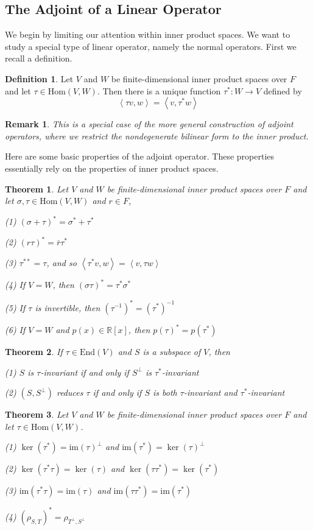 \documentclass{book}
\newtheorem{theorem}{Theorem}[section]
\newtheorem*{remark}{Remark}
\theoremstyle{definition}
\newtheorem{definition}{Definition}[section]
\begin{document}
\subsection{The Adjoint of a Linear Operator}
We begin by limiting our attention within inner product spaces. We want to study a special type of linear operator, namely the normal operators. First we recall a definition.
\begin{definition}
Let $V$ and $W$ be finite-dimensional inner product spaces over $F$ and let $\tau\in \text{Hom}(V,W)$. Then there is a unique function $\tau^*:W\to V$ defined by \[\left \langle\tau v,w \right \rangle =\left \langle v,\tau^*w \right \rangle  \]
\end{definition}
\begin{remark}
This is a special case of the more general construction of adjoint operators, where we restrict the nondegenerate bilinear form to the inner product.
\end{remark}
Here are some basic properties of the adjoint operator. These properties essentially rely on the properties of inner product spaces.
\begin{theorem}
Let $V$ and $W$ be finite-dimensional inner product spaces over $F$ and let $\sigma,\tau\in \text{Hom}(V,W)$ and $r\in F$,\par
(1) $(\sigma+\tau)^*=\sigma^*+\tau^*$\par
(2) $(r\tau)^*=\bar{r}\tau^*$\par
(3) $\tau^{**}=\tau$, and so $\left \langle\tau^* v,w \right \rangle =\left \langle v,\tau w \right \rangle $ \par
(4) If $V=W$, then $(\sigma\tau)^*=\tau^*\sigma^*$ \par
(5) If $\tau$ is invertible, then $(\tau^{-1})^*=(\tau^*)^{-1}$\par
(6) If $V=W$ and $p(x)\in\mathbb{R}[x]$, then $p(\tau)^*=p(\tau^*)$\par
\end{theorem}
\begin{theorem}
If $\tau\in \text{End}(V)$ and $S$ is a subspace of $V$, then\par
(1) $S$ is $\tau$-invariant if and only if $S^\perp$ is $\tau^*$-invariant \par
(2) $(S,S^\perp)$ reduces $\tau$ if and only if $S$ is both $\tau$-invariant and $\tau^*$-invariant
\end{theorem}
\begin{theorem}
Let $V$ and $W$ be finite-dimensional inner product spaces over $F$ and let $\tau\in \text{Hom}(V,W)$. \par
(1) $\ker(\tau^*)=\text{im}(\tau)^\perp$ and $\text{im}(\tau^*)=\ker(\tau)^\perp$ \par
(2) $\ker(\tau^*\tau)=\ker(\tau)$ and $\ker(\tau\tau^*)=\ker(\tau^*)$ \par
(3) $\text{im}(\tau^*\tau)=\text{im}(\tau)$ and $\text{im}(\tau\tau^*)=\text{im}(\tau^*)$ \par
(4) $(\rho_{S,T})^*=\rho_{T^\perp,S^\perp}$
\end{theorem}
\end{document}
